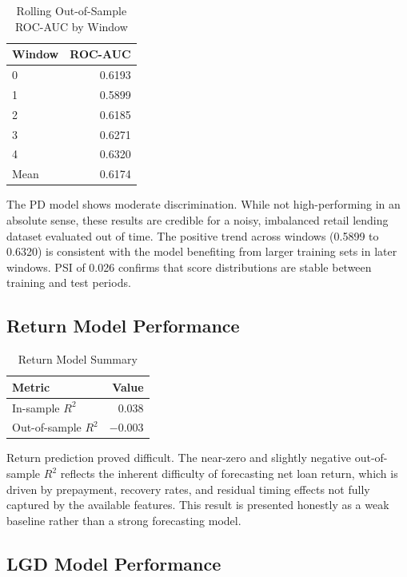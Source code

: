 \documentclass[12pt]{article}
\begin{document}
\begin{table}[H]
\centering
\caption{Rolling Out-of-Sample ROC-AUC by Window}
\begin{tabular}{lr}
\toprule
Window & ROC-AUC \\
\midrule
0 & 0.6193 \\
1 & 0.5899 \\
2 & 0.6185 \\
3 & 0.6271 \\
4 & 0.6320 \\
\midrule
Mean & 0.6174 \\
\bottomrule
\end{tabular}
\end{table}

The PD model shows moderate discrimination. While not high-performing in an absolute sense, these results are credible for a noisy, imbalanced retail lending dataset evaluated out of time. The positive trend across windows (0.5899 to 0.6320) is consistent with the model benefiting from larger training sets in later windows. PSI of 0.026 confirms that score distributions are stable between training and test periods.

\subsection{Return Model Performance}

\begin{table}[H]
\centering
\caption{Return Model Summary}
\begin{tabular}{lr}
\toprule
Metric & Value \\
\midrule
In-sample $R^2$ & 0.038 \\
Out-of-sample $R^2$ & $-0.003$ \\
\bottomrule
\end{tabular}
\end{table}

Return prediction proved difficult. The near-zero and slightly negative out-of-sample $R^2$ reflects the inherent difficulty of forecasting net loan return, which is driven by prepayment, recovery rates, and residual timing effects not fully captured by the available features. This result is presented honestly as a weak baseline rather than a strong forecasting model.

\subsection{LGD Model Performance}
\end{document}
